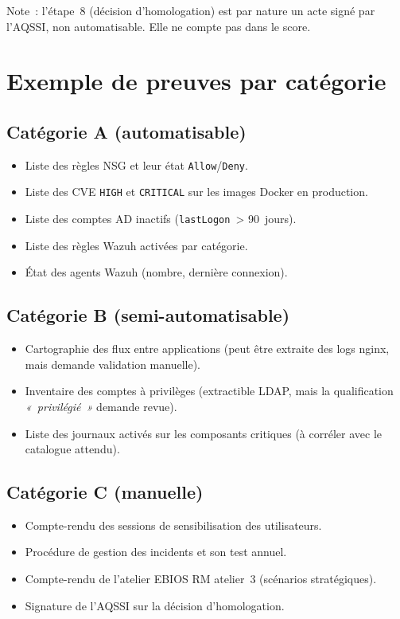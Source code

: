Note~: l'étape~8 (décision d'homologation) est par nature un acte
signé par l'AQSSI, non automatisable. Elle ne compte pas dans le
score.

\section{Exemple de preuves par catégorie}

\subsection{Catégorie A (automatisable)}

\begin{itemize}
  \item Liste des règles NSG et leur état \texttt{Allow}/\texttt{Deny}.
  \item Liste des CVE \texttt{HIGH} et \texttt{CRITICAL} sur les
    images Docker en production.
  \item Liste des comptes AD inactifs (\texttt{lastLogon}~>
    90~jours).
  \item Liste des règles Wazuh activées par catégorie.
  \item État des agents Wazuh (nombre, dernière connexion).
\end{itemize}

\subsection{Catégorie B (semi-automatisable)}

\begin{itemize}
  \item Cartographie des flux entre applications (peut être
    extraite des logs nginx, mais demande validation manuelle).
  \item Inventaire des comptes à privilèges (extractible LDAP,
    mais la qualification \emph{«~privilégié~»} demande revue).
  \item Liste des journaux activés sur les composants critiques
    (à corréler avec le catalogue attendu).
\end{itemize}

\subsection{Catégorie C (manuelle)}

\begin{itemize}
  \item Compte-rendu des sessions de sensibilisation des
    utilisateurs.
  \item Procédure de gestion des incidents et son test annuel.
  \item Compte-rendu de l'atelier EBIOS RM atelier~3
    (scénarios stratégiques).
  \item Signature de l'AQSSI sur la décision d'homologation.
\end{itemize}

